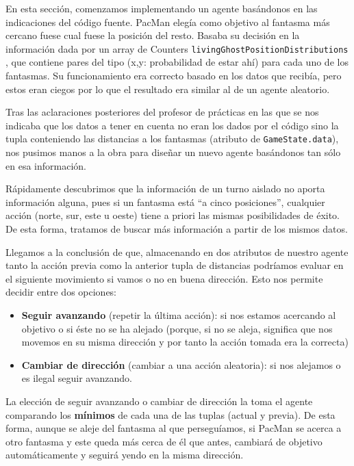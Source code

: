 \documentclass[12pt]{article}
\begin{document}
En esta sección, comenzamos implementando un agente basándonos en las
indicaciones del código fuente. PacMan elegía como objetivo al fantasma más
cercano fuese cual fuese la posición del resto. Basaba su decisión en la
información dada por un array de Counters \texttt{livingGhostPositionDistributions}
, que contiene pares del tipo (x,y: probabilidad de estar ahí) para cada uno de
los fantasmas. Su funcionamiento era correcto basado en los datos que recibía,
pero estos eran ciegos por lo que el resultado era similar al de un agente
aleatorio.

Tras las aclaraciones posteriores del profesor de prácticas en las que se nos
indicaba que los datos a tener en cuenta no eran los dados por el código sino
la tupla conteniendo las distancias a los fantasmas (atributo de
\texttt{GameState.data}), nos pusimos manos a la obra para diseñar un nuevo
agente basándonos tan sólo en esa información.

Rápidamente descubrimos que la información de un turno aislado no aporta
información alguna, pues si un fantasma está ``a cinco posiciones'', cualquier
acción (norte, sur, este u oeste) tiene a priori las mismas posibilidades de
éxito. De esta forma, tratamos de buscar más información a partir de los mismos
datos.

Llegamos a la conclusión de que, almacenando en dos atributos de nuestro agente
tanto la acción previa como la anterior tupla de distancias podríamos evaluar
en el siguiente movimiento si vamos o no en buena dirección. Esto nos permite
decidir entre dos opciones:

\begin{itemize}
    \item \textbf{Seguir avanzando} (repetir la última acción): si nos estamos
    acercando al objetivo o si éste no se ha alejado (porque, si no se aleja,
    significa que nos movemos en su misma dirección y por tanto la acción
    tomada era la correcta)
    \item \textbf{Cambiar de dirección} (cambiar a una acción aleatoria): si
    nos alejamos o es ilegal seguir avanzando.
\end{itemize}

La elección de seguir avanzando o cambiar de dirección la toma el agente
comparando los \textbf{mínimos} de cada una de las tuplas (actual y previa). De
esta forma, aunque se aleje del fantasma al que perseguíamos, si PacMan se
acerca a otro fantasma y este queda más cerca de él que antes, cambiará de
objetivo automáticamente y seguirá yendo en la misma dirección.
\end{document}
